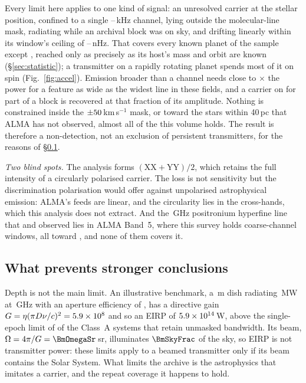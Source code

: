 Every limit here applies to one kind of signal: an unresolved carrier at the
stellar position, confined to a single \ChanLoA--\ChanHiA\,kHz channel, lying
outside the molecular-line mask, radiating while an archival block was on sky,
and drifting linearly within its window's ceiling of
\DriftCeilLo--\DriftCeilHi\,nHz. That covers every known planet of the sample
except \AccelWorstName, reached only as precisely as its host's mass and orbit
are known (\S\ref{sec:statistic}); a transmitter on a rapidly rotating planet
spends most of it on spin (Fig.~\ref{fig:accel}). Emission broader than a channel needs close to
\ScNBroadRatio$\times$ the power for a feature as wide as the widest line in
these fields, and a carrier on for part of a block is recovered at that
fraction of its amplitude. Nothing is constrained inside the
$\pm50$\,km\,s$^{-1}$ mask, or toward the stars within 40\,pc that
ALMA has not observed, almost all of the \NGaiaCensus{} this volume holds. The
result is therefore a non-detection, not an exclusion of persistent
transmitters, for the reasons of \S\ref{sec:mmdifferent}.

\noindent\emph{Two blind spots.} The analysis forms
$(\mathrm{XX}+\mathrm{YY})/2$, which retains the full intensity of a circularly
polarised carrier. The loss is not sensitivity but the discrimination
polarisation would offer against unpolarised astrophysical emission: ALMA's
feeds are linear, and the circularity lies in the cross-hands, which this
analysis does not extract. And the \SbPriorFreqGHz\,GHz positronium hyperfine
line that \citet{Steffes1994} and \citet{Mauersberger1996} observed lies in
ALMA Band~5, where this survey holds \LnBFiveWin{} coarse-channel windows, all
toward \LnBFiveStars, and none of them covers it.

\subsection{What prevents stronger conclusions}
\label{sec:mmdifferent}

Depth is not the main limit. An illustrative benchmark, a \BenchDiam\,m dish
radiating \BenchPowerMW\,MW at \BenchFreqGHz\,GHz with an aperture efficiency
of \BenchEta, has a directive gain $G=\eta(\pi D\nu/c)^{2}=5.9\times10^{8}$ and so
an EIRP of $5.9\times10^{14}$\,W, above the single-epoch limit of \BenchNSysA{} of
the \NSysALim{} Class~A systems that retain unmasked bandwidth. Its beam,
$\Omega=4\pi/G=\BmOmegaSr$\,sr, illuminates $\BmSkyFrac$ of the sky, so EIRP
is not transmitter power: these limits apply to a beamed transmitter only if
its beam contains the Solar System. What limits the archive is the
astrophysics that imitates a carrier, and the repeat coverage it happens to
hold.

